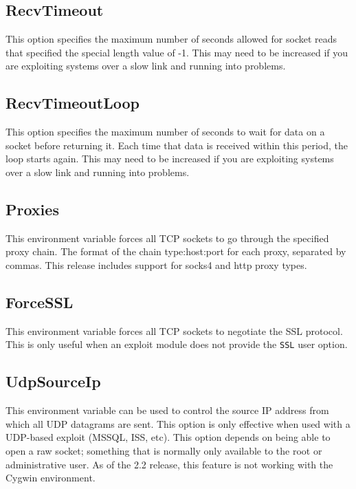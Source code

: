 \documentclass{report}
\begin{document}
	\subsection{RecvTimeout}
\par
This option specifies the maximum number of seconds allowed for socket reads
that specified the special length value of -1. This may need to be increased if
you are exploiting systems over a slow link and running into problems. 

	\subsection{RecvTimeoutLoop}
\par
This option specifies the maximum number of seconds to wait for data on a socket
before returning it. Each time that data is received within this period, the
loop starts again. This may need to be increased if you are exploiting systems
over a slow link and running into problems.  

	\subsection{Proxies}
\par
This environment variable forces all TCP sockets to go through the specified
proxy chain. The format of the chain type:host:port for each proxy, separated by
commas. This release includes support for socks4 and http proxy types. 

	\subsection{ForceSSL}
\par
This environment variable forces all TCP sockets to negotiate the SSL protocol.
This is only useful when an exploit module does not provide the \texttt{SSL}
user option.  

	\subsection{UdpSourceIp}
\par
This environment variable can be used to control the source IP address from
which all UDP datagrams are sent. This option is only effective when used with a
UDP-based exploit (MSSQL, ISS, etc). This option depends on being able to open a
raw socket; something that is normally only available to the root or
administrative user. As of the 2.2 release, this feature is not working with the
Cygwin environment. 
\end{document}
